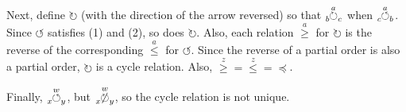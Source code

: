\documentclass{article}
\newcommand{\ternary}[4]{\hspace{-1mm}\tensor[_{#3}]{\overset{#2}{#1}}{_{#4}}}
\newcommand{\cyc}[3]{\ternary{\circlearrowleft}{#1}{#2}{#3}}
\newcommand{\po}[1]{\overset{#1}{\leq}}
\begin{document}
\begin{enumerate}[label=(\roman*)]
  \newcommand{\backcyc}[3]{\ternary{\circlearrowright}{#1}{#2}{#3}}
  \newcommand{\notbackcyc}[3]{\ternary{\not\circlearrowright}{#1}{#2}{#3}}
  \newcommand{\backpo}[1]{\overset{#1}{\geq}}

  Next, define $\circlearrowright$ (with the direction of the arrow reversed)
  so that $\backcyc{a}{b}{c}$ when $\cyc{a}{c}{b}$.
  Since $\circlearrowleft$ satisfies (1) and (2), so does $\circlearrowright$.
  Also, each relation $\backpo{a}$ for $\circlearrowright$
  is the reverse of the corresponding $\po{a}$ for $\circlearrowleft$.
  Since the reverse of a partial order is also a partial order,
  $\circlearrowright$ is a cycle relation.
  Also, $\backpo{z} = \po{z} = \preceq$.

  Finally, $\cyc{w}{x}{y}$, but $\notbackcyc{w}{x}{y}$,
  so the cycle relation is not unique.
\end{enumerate}
\end{document}
